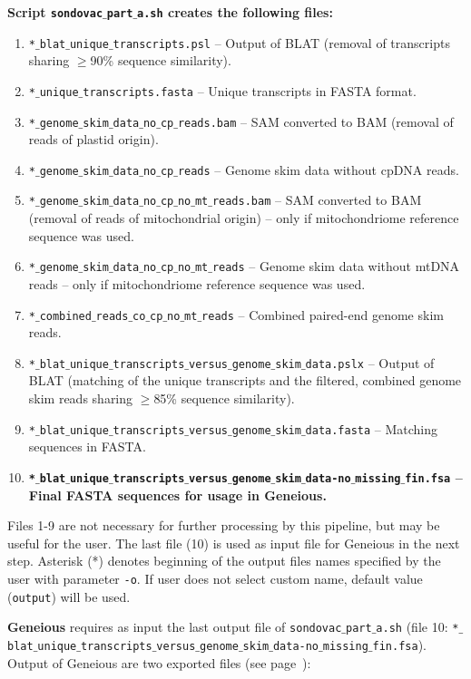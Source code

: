 \documentclass[a4paper, 11pt, twoside]{article}
\begin{document}
\textbf{Script \texttt{sondovac$\_$part$\_$a.sh} creates the following files:}

\begin{enumerate}
  \item \texttt{*$\_$blat$\_$unique$\_$transcripts.psl} -- Output of BLAT (removal of transcripts sharing $\geq$90\% sequence similarity).
  \item \texttt{*$\_$unique$\_$transcripts.fasta} -- Unique transcripts in FASTA format.
  \item \texttt{*$\_$genome$\_$skim$\_$data$\_$no$\_$cp$\_$reads.bam} -- SAM converted to BAM (removal of reads of plastid origin).
  \item \texttt{*$\_$genome$\_$skim$\_$data$\_$no$\_$cp$\_$reads} -- Genome skim data without cpDNA reads.
  \item \texttt{*$\_$genome$\_$skim$\_$data$\_$no$\_$cp$\_$no$\_$mt$\_$reads.bam} -- SAM converted to BAM (removal of reads of mitochondrial origin)  -- only if mitochondriome reference sequence was used.
  \item \texttt{*$\_$genome$\_$skim$\_$data$\_$no$\_$cp$\_$no$\_$mt$\_$reads} -- Genome skim data without mtDNA reads -- only if mitochondriome reference sequence was used.
  \item \texttt{*$\_$combined$\_$reads$\_$co$\_$cp$\_$no$\_$mt$\_$reads} -- Combined paired-end genome skim reads.
  \item \texttt{*$\_$blat$\_$unique$\_$transcripts$\_$versus$\_$genome$\_$skim$\_$data.pslx} -- Output of BLAT (ma\-tching of the unique transcripts and the filtered, combined genome skim reads sharing $\geq$85\% sequence similarity).
  \item \texttt{*$\_$blat$\_$unique$\_$transcripts$\_$versus$\_$genome$\_$skim$\_$data.fasta} -- Matching sequences in FASTA.
  \item \textbf{\texttt{*$\_$blat$\_$unique$\_$transcripts$\_$versus$\_$genome$\_$skim$\_$data-no$\_$missing$\_$fin.fsa} -- Final FASTA sequences for usage in Geneious.}
\end{enumerate}

Files 1-9 are not necessary for further processing by this pipeline, but may be useful for the user. The last file (10) is used as input file for Geneious in the next step. Asterisk (*) denotes beginning of the output files names specified by the user with parameter \texttt{-o}. If user does not select custom name, default value (\texttt{output}) will be used.

\textbf{Geneious} requires as input the last output file of \texttt{sondovac$\_$part$\_$a.sh} (file 10: \texttt{*$\_$blat$\_$\allowbreak unique$\_$\allowbreak transcripts$\_$\allowbreak versus$\_$\allowbreak genome$\_$\allowbreak skim$\_$\allowbreak data-no$\_$\allowbreak missing$\_$\allowbreak fin.fsa}). Output of Geneious are two exported files (see page~\pageref{geneious-usage}):
\end{document}
